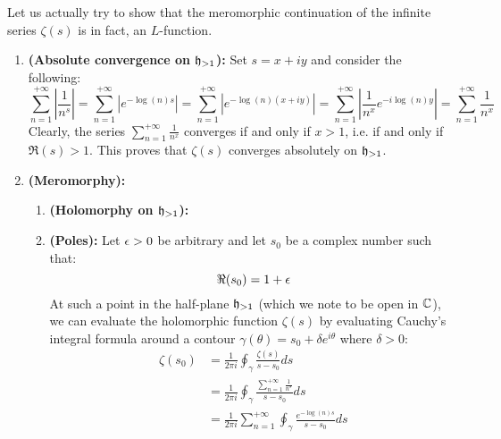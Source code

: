 \begin{example}
\begin{enumerate}
                        Let us actually try to show that the meromorphic continuation of the infinite series $\zeta(s)$ is in fact, an $L$-function.
                            \begin{enumerate}
                                \item \textbf{(Absolute convergence on $\h_{> 1}$):} Set $s = x + iy$ and consider the following:
                                    $$\sum_{n = 1}^{+\infty} \left|\frac{1}{n^s}\right| = \sum_{n = 1}^{+\infty} |e^{- \log(n) s}| = \sum_{n = 1}^{+\infty} |e^{- \log(n) (x + iy)}|  = \sum_{n = 1}^{+\infty} \left|\frac{1}{n^x} e^{- i \log(n) y}\right| = \sum_{n = 1}^{+\infty} \frac{1}{n^x}$$
                                Clearly, the series $\sum_{n = 1}^{+\infty} \frac{1}{n^x}$ converges if and only if $x > 1$, i.e. if and only if $\Re(s) > 1$. This proves that $\zeta(s)$ converges absolutely on $\h_{> 1}$.
                                \item \textbf{(Meromorphy):}
                                    \begin{enumerate}
                                        \item \textbf{(Holomorphy on $\h_{> 1}$):}
                                        \item \textbf{(Poles):} Let $\e > 0$ be arbitrary and let $s_0$ be a complex number such that:
                                            $$\Re(s_0) = 1 + \e$$
                                        At such a point in the half-plane $\h_{> 1}$ (which we note to be open in $\bbC$), we can evaluate the holomorphic function $\zeta(s)$ by evaluating Cauchy's integral formula around a contour $\gamma(\theta) = s_0 + \delta e^{i\theta}$ where $\delta > 0$:
                                            $$
                                                \begin{aligned}
                                                    \zeta(s_0) & = \frac{1}{2\pi i} \oint_{\gamma} \frac{\zeta(s)}{s - s_0} ds
                                                    \\
                                                    & = \frac{1}{2\pi i} \oint_{\gamma} \frac{\sum_{n = 1}^{+\infty} \frac{1}{n^s}}{s - s_0} ds
                                                    \\
                                                    & = \frac{1}{2\pi i} \sum_{n = 1}^{+\infty} \oint_{\gamma} \frac{e^{- \log(n) s}}{s - s_0} ds
                                                    \\

\end{aligned}$$
\end{enumerate}
\end{enumerate}
\end{enumerate}
\end{example}
